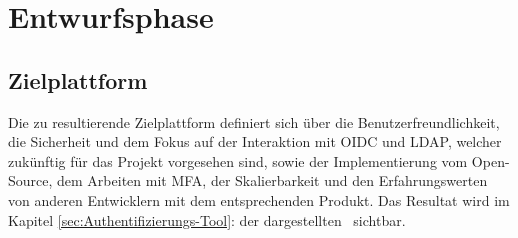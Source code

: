 \section{Entwurfsphase} 
\label{sec:Entwurfsphase}

\subsection{Zielplattform}
\label{sec:Zielplattform}
Die zu resultierende Zielplattform definiert sich über die Benutzerfreundlichkeit, die Sicherheit und dem Fokus auf der Interaktion 
mit OIDC und LDAP, welcher zukünftig für das Projekt vorgesehen sind, sowie der Implementierung vom Open-Source, dem Arbeiten mit MFA, 
der Skalierbarkeit und den Erfahrungswerten von anderen Entwicklern mit dem entsprechenden Produkt. Das Resultat wird im Kapitel 
\ref{sec:Authentifizierungs-Tool}:  der dargestellten~ sichtbar.


